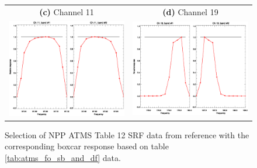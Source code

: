 \begin{figure}[htp]
\begin{tabular}{c c}
    \textsf{\textbf{(c)} Channel 11} &
    \textsf{\textbf{(d)} Channel 19} \\
    \includegraphics[scale=0.5]{graphics/srf/atms_npp.ch11.srf.eps} &
    \includegraphics[scale=0.5]{graphics/srf/atms_npp.ch19.srf.eps}
  \end{tabular}
  \caption{Selection of NPP ATMS Table 12 SRF data from reference \cite{ATMS_PFM_CalLog} with the corresponding boxcar response based on table \ref{tab:atms_fo_sb_and_df} data.}
  \label{fig:srf_selection}
\end{figure}




